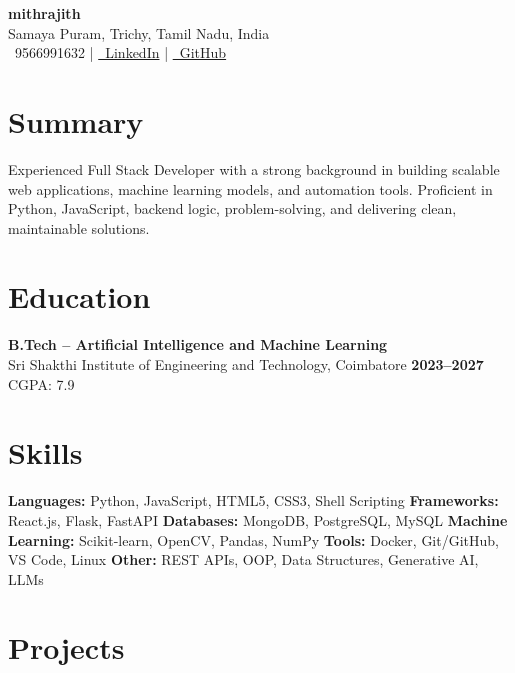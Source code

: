 \documentclass[a4paper,12pt]{article}
\begin{document}
\begin{center}
    {\Huge \textbf{\textcolor{accent}{mithrajith}}} \\[2pt]
    Samaya Puram, Trichy, Tamil Nadu, India \\[4pt]
    \faPhone\ 9566991632 \quad | \quad
    \href{https://www.linkedin.com/in/mithrajitks046}{\faLinkedin\ LinkedIn} \quad | \quad
    \href{https://github.com/mithrajith46}{\faGithub\ GitHub}
\end{center}

\section*{Summary}
Experienced Full Stack Developer with a strong background in building scalable web applications, machine learning models, and automation tools. Proficient in Python, JavaScript, backend logic, problem-solving, and delivering clean, maintainable solutions.

\section*{Education}
\textbf{B.Tech – Artificial Intelligence and Machine Learning} \\
Sri Shakthi Institute of Engineering and Technology, Coimbatore  
\hfill \textbf{2023–2027} \\
CGPA: 7.9

\section*{Skills}
\textbf{Languages:} Python, JavaScript, HTML5, CSS3, Shell Scripting  
\textbf{Frameworks:} React.js, Flask, FastAPI  
\textbf{Databases:} MongoDB, PostgreSQL, MySQL  
\textbf{Machine Learning:} Scikit-learn, OpenCV, Pandas, NumPy  
\textbf{Tools:} Docker, Git/GitHub, VS Code, Linux  
\textbf{Other:} REST APIs, OOP, Data Structures, Generative AI, LLMs

\section*{Projects}
\end{document}
